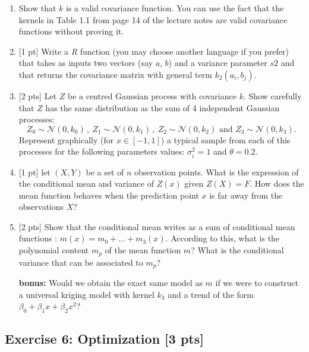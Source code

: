 \documentclass[a4paper,10pt]{article}
\begin{document}
\begin{enumerate}[label=Q\arabic*.]
\item  Show that $k$ is a valid covariance function. You can use the fact that the kernels in Table 1.1 from page 14 of the lecture notes are valid covariance functions without proving it. 
\item {[1 pt]} Write a \emph{R} function (you may choose another language if you prefer) that takes as inputs two vectors (say $a$, $b$) and a variance parameter $s2$ and that returns the covariance matrix with general term $k_2(a_i,b_j)$.
\item {[2 pts]} Let $Z$ be a centred Gaussian process with covariance $k$. Show carefully that $Z$ has the same distribution as the sum of 4 independent Gaussian processes:
\begin{equation*}
Z_0 \sim \mathcal{N}(0,k_0)\, ,\ 
Z_1 \sim \mathcal{N}(0,k_1)\, ,\ 
Z_2 \sim \mathcal{N}(0,k_2)\text{ and } 
Z_3 \sim \mathcal{N}( 0,k_3).
\end{equation*}
Represent graphically (for $x \in [-1,1]$) a typical sample from each of this processes for the following parameters values: $\sigma_i^2 = 1$ and $\theta = 0.2$.
\item {[1 pt]} let $(X,Y)$ be a set of $n$ observation points. What is the expression of the conditional mean and variance of $Z(x)$ given $Z(X)=F$. How does the mean function behaves when the prediction point $x$ is far away from the observations $X$?
\item {[2 pts]} Show that the conditional mean writes as a sum of conditional mean functions : $m(x) = m_0 + \dots + m_3(x)$. According to this, what is the polynomial content $m_p$ of the mean function $m$? What is the conditional variance that can be associated to $m_p$?
\item[\textbf{bonus:}] Would we obtain the exact same model as $m$ if we were to construct a universal kriging model with kernel $k_3$ and a trend of the form $\beta_0 + \beta_1 x + \beta_2 x^2$?
\end{enumerate}

\subsection*{Exercise 6: Optimization \hfill [3 pts]}
\end{document}
